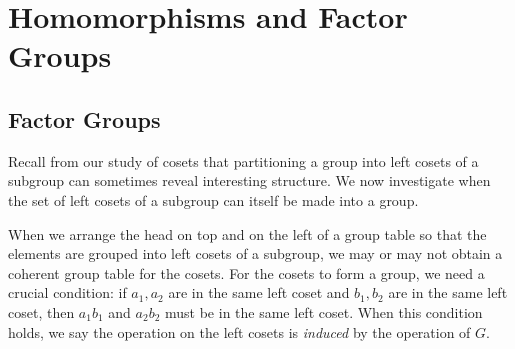 
\section{Homomorphisms and Factor Groups}



\subsection{Factor Groups}

Recall from our study of cosets that partitioning a group into left cosets of a subgroup can sometimes reveal interesting structure. We now investigate when the set of left cosets of a subgroup can itself be made into a group.

When we arrange the head on top and on the left of a group table so that the elements are grouped into left cosets of a subgroup, we may or may not obtain a coherent group table for the cosets. For the cosets to form a group, we need a crucial condition: if $a_1, a_2$ are in the same left coset and $b_1, b_2$ are in the same left coset, then $a_1 b_1$ and $a_2 b_2$ must be in the same left coset. When this condition holds, we say the operation on the left cosets is \textit{induced} by the operation of $G$.


